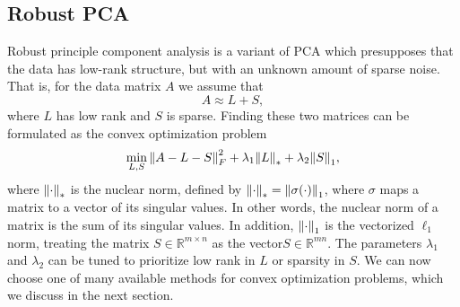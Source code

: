 \documentclass[12pt]{article}
\newcommand{\R}{\mathbb{R}}
\begin{document}
%

\subsection{Robust PCA}
Robust principle component analysis is a variant of PCA which presupposes that the data has low-rank structure, but with an unknown amount of sparse noise. That is, for the data matrix $A$ we assume that 
\begin{equation}  A \approx L + S, \end{equation}
where $L$ has low rank and $S$ is sparse. Finding these two matrices can be formulated as the convex optimization problem
\begin{align}
\min_{L,S} \norm{A-L-S}_{F}^2 + \lambda_1 \norm{L}_* + \lambda_2 \norm{S}_1,
\label{eq:robust_obj}
\end{align}
where $\norm{\cdot}_*$ is the nuclear norm, defined by $\norm{\cdot}_* = \norm{\sigma(\cdot)}_1$, where $\sigma$ maps a matrix to a vector of its singular values. In other words, the nuclear norm of a matrix is the sum of its singular values. In addition, $\norm{\cdot}_1$ is the vectorized $\ell_1$ norm, treating the matrix $S \in \R^{m \times n}$ as the vector$S \in \R^{mn}.$ The parameters $\lambda_1$ and $\lambda_2$ can be tuned to prioritize low rank in $L$ or sparsity in $S.$ We can now choose one of many available methods for convex optimization problems, which we discuss in the next section. 
\end{document}
